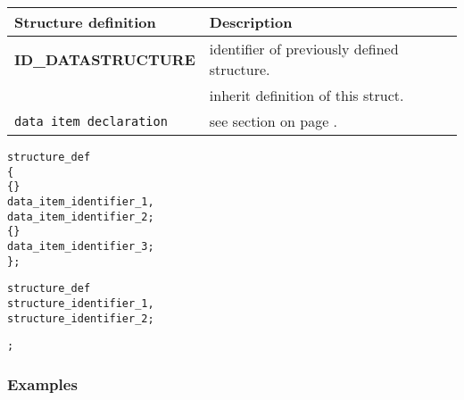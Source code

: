 

\begin{tabularx}{\textwidth}{l|X}
Structure definition            & Description \\
\hline
{\bfseries ID\_DATASTRUCTURE}   & identifier of previously defined structure. \\
                                & inherit definition of this struct. \\
\verb+data item declaration+ & see section \nameref{sec:dpitem} on page \pageref{sec:dpitem}. \\
\end{tabularx}
\vspace{0.5cm}



\begin{boxedminipage}[t]{\linewidth}
\begin{alltt}
\DATAPOOL
  \STRUCT structure\_def
  \{
     \INTEGER \{\EDITABLE\}
        data\_item\_identifier_1,
        data\_item\_identifier_2;
     \REAL \{\OPTIONAL\}
        data\_item\_identifier_3;
  \};

  structure\_def
    structure\_identifier_1,
    structure\_identifier_2;

\END \DATAPOOL;
\end{alltt}
\end{boxedminipage}


\newpage
\subsubsection{Examples}
\label{sec:dpexamples}


